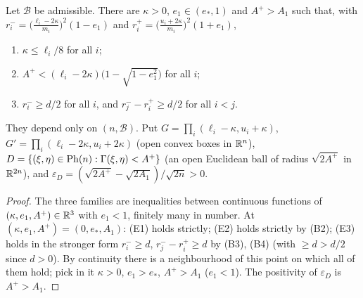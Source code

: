 \begin{lemma}\label{bpP:p14:enlarge}
Let $\mathcal B$ be admissible. There are $\kappa>0$, $e_1\in(e_*,1)$ and $A^+>A_1$ such that, with $r_i^-=\bigl(\frac{\ell_i-2\kappa}{m_i}\bigr)^2(1-e_1)$ and $r_i^+=\bigl(\frac{u_i+2\kappa}{m_i}\bigr)^2(1+e_1)$,
\begin{enumerate}[label=(E\arabic*)]
\item $\kappa\le\ell_i/8$ for all $i$;
\item $A^+<(\ell_i-2\kappa)\bigl(1-\sqrt{1-e_1^2}\bigr)$ for all $i$;
\item $r_i^-\ge d/2$ for all $i$, and $r_j^--r_i^+\ge d/2$ for all $i<j$.
\end{enumerate}
They depend only on $(n,\mathcal B)$. Put $G=\prod_i(\ell_i-\kappa,u_i+\kappa)$, $G'=\prod_i(\ell_i-2\kappa,u_i+2\kappa)$ (open convex boxes in $\mathbb{R}^n$), $D=\{(\xi,\eta)\in\mathrm{Ph}(n):\Gamma(\xi,\eta)<A^+\}$ (an open Euclidean ball of radius $\sqrt{2A^+}$ in $\mathbb{R}^{2n}$), and $\varepsilon_D=(\sqrt{2A^+}-\sqrt{2A_1})/\sqrt{2n}>0$.
\end{lemma}
\begin{proof}
\label{stepP:p14:en-lim} The three families are inequalities between continuous functions of $(\kappa,e_1,A^+)\in\mathbb{R}^3$ with $e_1<1$, finitely many in number. At $(\kappa,e_1,A^+)=(0,e_*,A_1)$: (E1) holds strictly; (E2) holds strictly by (B2); (E3) holds in the stronger form $r^-_i\ge d$, $r^-_j-r^+_i\ge d$ by (B3), (B4) (with $\ge d>d/2$ since $d>0$).
\label{stepP:p14:en-choice} By continuity there is a neighbourhood of this point on which all of them hold; pick in it $\kappa>0$, $e_1>e_*$, $A^+>A_1$ ($e_1<1$). The positivity of $\varepsilon_D$ is $A^+>A_1$.
\end{proof}

